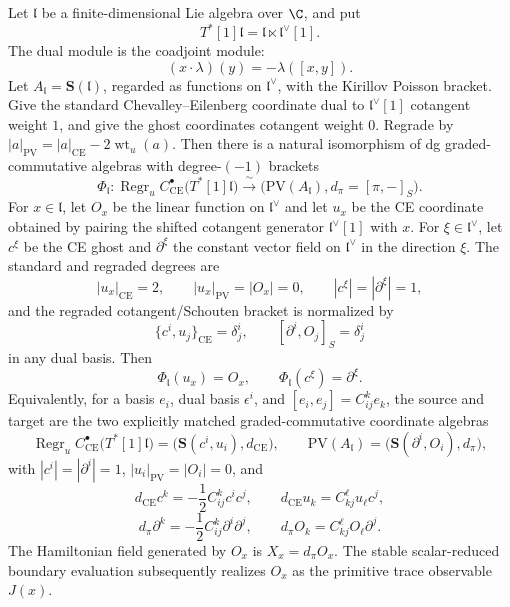 \documentclass[11pt]{memoir}
\begin{document}
\begin{thm}
  \label{thm:coordinate-free-cotangent-ce-pv}
  \label{thm:finite-cotangent-ce-pv-identity}
  Let \(\mathfrak l\) be a finite-dimensional Lie algebra over \(\C\), and
  put
	  \[
	    T^*[1]\mathfrak l=\mathfrak l\ltimes\mathfrak l^\vee[1].
	  \]
  The dual module is the coadjoint module:
  \[
    (x\cdot\lambda)(y)=-\lambda([x,y]).
  \]
	  Let \(A_{\mathfrak l}=\mathbf S(\mathfrak l)\), regarded as functions on
	  \(\mathfrak l^\vee\), with the Kirillov Poisson bracket.  Give the
  standard Chevalley--Eilenberg coordinate dual to
  \(\mathfrak l^\vee[1]\) cotangent weight \(1\), and give the ghost
  coordinates cotangent weight \(0\).  Regrade by
  \(|a|_{\mathrm{PV}}=|a|_{\mathrm{CE}}-2\operatorname{wt}_u(a)\).
  Then there is a natural isomorphism of dg graded-commutative algebras
  with degree-\((-1)\) brackets
  \[
    \Phi_{\mathfrak l}:
    \operatorname{Regr}_u
    C^\bullet_{\mathrm{CE}}\bigl(T^*[1]\mathfrak l\bigr)
      \xrightarrow{\ \sim\ }
    \bigl(\mathrm{PV}(A_{\mathfrak l}),d_\pi=[\pi,-]_S\bigr).
  \]
  For \(x\in\mathfrak l\), let \(O_x\) be the linear function on
  \(\mathfrak l^\vee\) and let \(u_x\) be the CE coordinate obtained by
  pairing the shifted cotangent generator
  \(\mathfrak l^\vee[1]\) with \(x\). For
  \(\xi\in\mathfrak l^\vee\), let \(c^\xi\) be the CE ghost and
  \(\partial^\xi\) the constant vector field on
  \(\mathfrak l^\vee\) in the direction \(\xi\).  The standard and
  regraded degrees are
  \[
    |u_x|_{\mathrm{CE}}=2,\qquad
    |u_x|_{\mathrm{PV}}=|O_x|=0,\qquad
    |c^\xi|=|\partial^\xi|=1,
  \]
  and the regraded cotangent/Schouten bracket is normalized by
  \[
    \{c^i,u_j\}_{\mathrm{CE}}=\delta^i_j,\qquad
    [\partial^i,O_j]_S=\delta^i_j
  \]
  in any dual basis.  Then
  \[
    \Phi_{\mathfrak l}(u_x)=O_x,\qquad
    \Phi_{\mathfrak l}(c^\xi)=\partial^\xi .
  \]
  Equivalently, for a basis \(e_i\), dual basis \(\epsilon^i\), and
  \([e_i,e_j]=C^k_{ij}e_k\), the source and target are the two
  explicitly matched graded-commutative coordinate algebras
  \[
    \operatorname{Regr}_u C^\bullet_{\mathrm{CE}}\bigl(T^*[1]\mathfrak l\bigr)
      =
    \bigl(\mathbf S(c^i,u_i),d_{\mathrm{CE}}\bigr),
    \qquad
    \mathrm{PV}(A_{\mathfrak l})
      =
    \bigl(\mathbf S(\partial^i,O_i),d_\pi\bigr),
  \]
  with \(|c^i|=|\partial^i|=1\), \(|u_i|_{\mathrm{PV}}=|O_i|=0\), and
  \[
    d_{\mathrm{CE}}c^k=-\frac12C^k_{ij}c^ic^j,\qquad
    d_{\mathrm{CE}}u_k=C^\ell_{kj}u_\ell c^j,
  \]
  \[
    d_\pi\partial^k=-\frac12C^k_{ij}\partial^i\partial^j,\qquad
    d_\pi O_k=C^\ell_{kj}O_\ell\partial^j.
  \]
  The Hamiltonian field generated by \(O_x\) is
  \(X_x=d_\pi O_x\).  The stable scalar-reduced boundary evaluation
  subsequently realizes \(O_x\) as the primitive trace observable
  \(J(x)\).
\end{thm}
\end{document}
